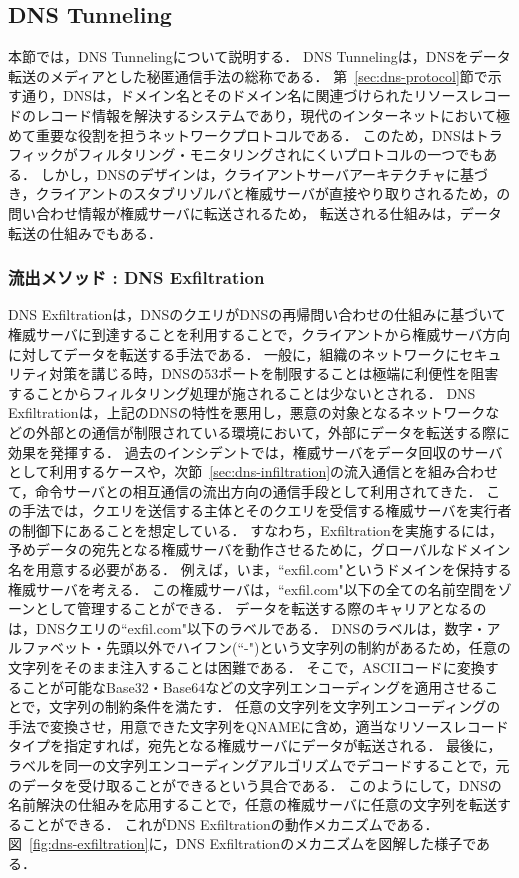 

\subsection{DNS Tunneling}
本節では，DNS Tunnelingについて説明する．
DNS Tunnelingは，DNSをデータ転送のメディアとした秘匿通信手法の総称である．
第~\ref{sec:dns-protocol}節で示す通り，DNSは，ドメイン名とそのドメイン名に関連づけられたリソースレコードのレコード情報を解決するシステムであり，現代のインターネットにおいて極めて重要な役割を担うネットワークプロトコルである．
このため，DNSはトラフィックがフィルタリング・モニタリングされにくいプロトコルの一つでもある．
しかし，DNSのデザインは，クライアントサーバアーキテクチャに基づき，クライアントのスタブリゾルバと権威サーバが直接やり取りされるため，の問い合わせ情報が権威サーバに転送されるため，
転送される仕組みは，データ転送の仕組みでもある．

\subsubsection{流出メソッド : DNS Exfiltration}
\label{sec:dns-exfiltration}
DNS Exfiltrationは，DNSのクエリがDNSの再帰問い合わせの仕組みに基づいて権威サーバに到達することを利用することで，クライアントから権威サーバ方向に対してデータを転送する手法である．
一般に，組織のネットワークにセキュリティ対策を講じる時，DNSの53ポートを制限することは極端に利便性を阻害することからフィルタリング処理が施されることは少ないとされる．
DNS Exfiltrationは，上記のDNSの特性を悪用し，悪意の対象となるネットワークなどの外部との通信が制限されている環境において，外部にデータを転送する際に効果を発揮する．
過去のインシデントでは，権威サーバをデータ回収のサーバとして利用するケースや，次節~\ref{sec:dns-infiltration}の流入通信とを組み合わせて，命令サーバとの相互通信の流出方向の通信手段として利用されてきた．
この手法では，クエリを送信する主体とそのクエリを受信する権威サーバを実行者の制御下にあることを想定している．
すなわち，Exfiltrationを実施するには，予めデータの宛先となる権威サーバを動作させるために，グローバルなドメイン名を用意する必要がある．
例えば，いま，``exfil.com"というドメインを保持する権威サーバを考える．
この権威サーバは，``exfil.com"以下の全ての名前空間をゾーンとして管理することができる．
データを転送する際のキャリアとなるのは，DNSクエリの``exfil.com"以下のラベルである．
DNSのラベルは，数字・アルファベット・先頭以外でハイフン(``-")という文字列の制約があるため，任意の文字列をそのまま注入することは困難である．
そこで，ASCIIコードに変換することが可能なBase32・Base64などの文字列エンコーディングを適用させることで，文字列の制約条件を満たす．
任意の文字列を文字列エンコーディングの手法で変換させ，用意できた文字列をQNAMEに含め，適当なリソースレコードタイプを指定すれば，宛先となる権威サーバにデータが転送される．
最後に，ラベルを同一の文字列エンコーディングアルゴリズムでデコードすることで，元のデータを受け取ることができるという具合である．
このようにして，DNSの名前解決の仕組みを応用することで，任意の権威サーバに任意の文字列を転送することができる．
これがDNS Exfiltrationの動作メカニズムである．
図~\ref{fig:dns-exfiltration}に，DNS Exfiltrationのメカニズムを図解した様子である．

